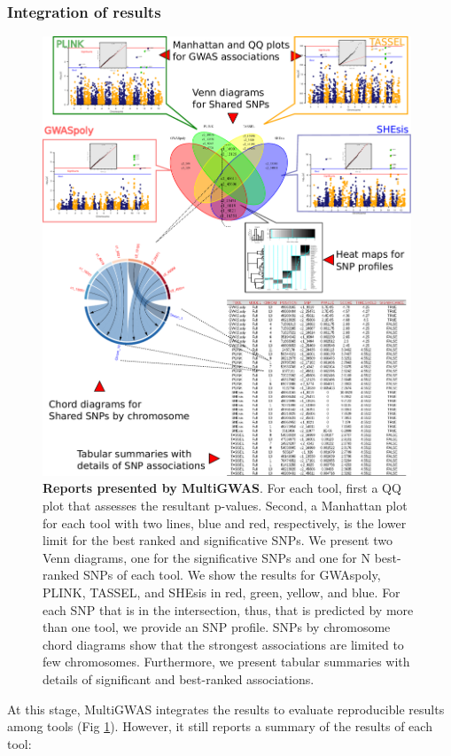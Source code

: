\documentclass{article}
\begin{document}
\subsubsection{Integration of results}
\begin{figure}
\includegraphics[width=11cm]{images/report-methodologies-all-plots} \caption{\textbf{Reports presented by MultiGWAS}. For each tool, first a QQ plot that assesses the resultant p-values. Second, a Manhattan plot for each tool with two lines, blue and red, respectively, is the lower limit for the best ranked and significative SNPs. We present two Venn diagrams, one for the significative SNPs and one for N best-ranked SNPs of each tool. We show the results for GWAspoly, PLINK, TASSEL, and SHEsis in red, green, yellow, and blue. For each SNP that is in the intersection, thus, that is predicted by more than one tool, we provide an SNP profile. SNPs by chromosome chord diagrams show that the strongest associations are limited to few chromosomes. Furthermore, we present tabular summaries with details of significant and best-ranked associations.\label{fig:Reports} }
\end{figure}
At this stage, MultiGWAS integrates the results to evaluate reproducible results among tools (Fig \ref{fig:Reports}). However, it still reports a summary of the results of each tool: 
\end{document}
